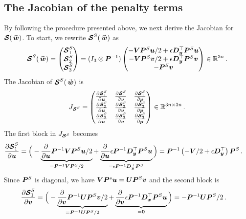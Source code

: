 \subsection{The Jacobian of the penalty terms}
By following the procedure presented above, we next derive the Jacobian for $\satn(\wn)$. To start, we rewrite $\satn^S(\wn)$ as
\begin{equation}
  \satn^S(\wn) = 
  \begin{pmatrix}
    \satn_1^S \\
    \satn_2^S \\
    \satn_3^S \\
  \end{pmatrix}
  =
  (I_3\otimes \Pn^{-1}) 
  \begin{pmatrix}
    -\Vn\Pn^S \un/2 + \epsilon \Dy^\top \Pn^S \un 
    \\
     -\Vn\Pn^S\vn /2+ \epsilon \Dy^\top \Pn^S \vn
    \\
    - \Pn^S\vn
  \end{pmatrix}
  \in \Rbb^{3n}
  \, .
  \label{eq:sat_s}
\end{equation}
The Jacobian of $\satn^S(\wn)$ is
\[
  J_{\bm{\mathcal{S}}^S} = 
  \begin{pmatrix}
    \frac{\partial \bm{\mathcal{S}}_1^S}{\partial \bm{u}}
    & 
    \frac{\partial \bm{\mathcal{S}}_1^S}{\partial \bm{v}}
    &
    \frac{\partial \bm{\mathcal{S}}_1^S}{\partial \bm{p}}
    \\
    \frac{\partial \bm{\mathcal{S}}_2^S}{\partial \bm{u}}
    & 
    \frac{\partial \bm{\mathcal{S}}_2^S}{\partial \bm{v}}
    &
    \frac{\partial \bm{\mathcal{S}}_2^S}{\partial \bm{p}}
    \\
    \frac{\partial \bm{\mathcal{S}}_3^S}{\partial \bm{u}}
    & 
    \frac{\partial \bm{\mathcal{S}}_3^S}{\partial \bm{v}}
    &
    \frac{\partial \bm{\mathcal{S}}_3^S}{\partial \bm{p}}
  \end{pmatrix}
  \in \mathbb{R}^{3n\times 3n}
  \, .
\]
The first block in $J_{\bm{\mathcal{S}}^S}$ becomes
{\small
\begin{align*}
  \frac{\partial \bm{\mathcal{S}}_1^S}{\partial \bm{u}} & =
  \Big(-
  \underbrace{\frac{\partial}{\partial \bm{u}}
  \bm{P}^{-1}\bm{V}\bm{P}^S \bm{u}/2}_{= \bm{P}^{-1}\bm{V}\bm{P}^S/2}
  + 
  \underbrace{
  \frac{\partial}{\partial \bm{u}}
  \epsilon \bm{P}^{-1}\bm{D_y}^\top \bm{P}^S\bm{u}}_{= \epsilon\bm{P}^{-1} \bm{D_y}^\top \bm{P}^S} \Big)
  =
  \bm{P}^{-1}
  \left(-\bm{V}/2 + \epsilon \bm{D_y}^\top\right)\bm{P}^S 
  \, .
\end{align*}
}
Since $\bm{P}^S$ is diagonal, we have $\bm{V} \bm{P}^s \bm{u} = \bm{U} \bm{P}^S \bm{v}$ and the second block is
{\small
\begin{align*}
  \frac{\partial \bm{\mathcal{S}}_1^S}{\partial \bm{v}} & =
  \Big(-
  \underbrace{\frac{\partial}{\partial \bm{v}}
  \bm{P}^{-1}\bm{U}\bm{P}^S \bm{v}/2}_{= \bm{P}^{-1}\bm{U} \bm{P}^S /2}
  + 
  \underbrace{
  \frac{\partial}{\partial \bm{v}}\epsilon \bm{P}^{-1}\bm{D_x}^\top \bm{P}^S\bm{u}}_{= \bm{0}} \Big)
  = -\bm{P}^{-1}\bm{U}\bm{P}^S /2
  \, .
\end{align*}
}
